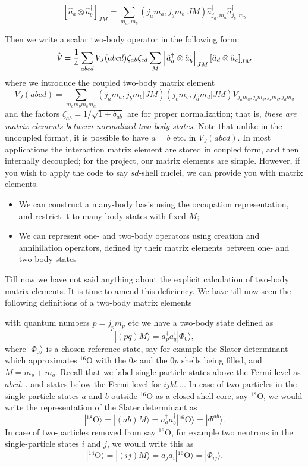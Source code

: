 {\[
\left[ \hat{a}^\dagger_a \otimes \hat{a}^\dagger_b \right ]_{JM}
=\sum_{m_a, m_b} (j_a m_a, j_b m_b | JM) 
\hat{a}^\dagger_{j_a,m_a} \hat{a}^\dagger_{j_b, m_b}
\]

Then we write a scalar two-body operator in the following form:
\[
\hat{\cal V} = 
\frac{1}{4} \sum_{abcd} V_J(abcd) \zeta_{ab} \zeta_{cd} 
\sum_M \left[ \hat{a}^\dagger_a \otimes \hat{a}^\dagger_b \right ]_{JM}
\left[ \hat{a}_d \otimes \hat{a}_c \right ]_{JM}
\]
where we introduce the coupled two-body matrix element
\[
V_J(abcd) = \sum_{m_a m_b m_c m_d} 
( j_a m_a, j_b m_b|JM) (j_c m_c, j_d m_d | J M)
V_{ j_a m_a, j_b m_b, j_c m_c, j_d m_d}
\]
and the factors $\zeta_{ab}=1/\sqrt{1+\delta_{ab}}$ are for proper normalization; that 
is, \textit{these are matrix elements between normalized two-body states.}
Note that unlike in the uncoupled format, it is possible to have $a=b$ etc. in 
$V_J(abcd)$.
In most applications the interaction matrix element are stored in coupled form, 
and then internally decoupled; for the project, our matrix elements are simple. However, if you wish to apply the code to say $sd$-shell nuclei, we can provide you with 
matrix elements.

\begin{itemize}

\item We can construct a many-body basis using the occupation representation, 
and restrict it to many-body states with fixed $M$;

\item We can represent one- and two-body operators using creation and 
annihilation operators, defined by their matrix elements between one- and two-body 
states

\end{itemize}


Till now we have not said anything about the explicit calculation of two-body matrix elements. It is time to amend this deficiency.
We have till now seen the following definitions of a two-body matrix elements 

with quantum numbers $p=j_pm_p$ etc we have a two-body state defined as
\[
|(pq)M\rangle  = a^{\dagger}_pa^{\dagger}_q|\Phi_0\rangle,
\]
where $|\Phi_0\rangle$ is a chosen reference state, say for example the Slater determinant which approximates $^{16}$O with the $0s$ and the $0p$ shells being filled, and $M=m_p+m_q$. Recall that we label single-particle states above the Fermi level as $abcd\dots$ and states below the Fermi level for $ijkl\dots$.  
In case of two-particles in the single-particle states $a$ and $b$ outside $^{16}$O as a closed shell core, say $^{18}$O, 
we would write the representation of the Slater determinant as
\[
|^{18}\mathrm{O}\rangle =|(ab)M\rangle  = a^{\dagger}_aa^{\dagger}_b|^{16}\mathrm{O}\rangle=|\Phi^{ab}\rangle.
\]
In case of two-particles removed from say $^{16}$O, for example two neutrons in the single-particle states $i$ and $j$, we would write this as
\[
|^{14}\mathrm{O}\rangle =|(ij)M\rangle  = a_ja_i|^{16}\mathrm{O}\rangle=|\Phi_{ij}\rangle.
\]


}
